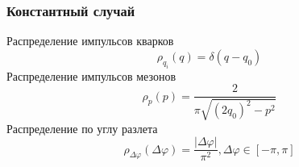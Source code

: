 \documentclass{beamer}
\renewcommand{\l}{\left( }
\renewcommand{\r}{\right) }
\renewcommand{\phi}{\varphi}
\newcommand{\br}[1]{\l {#1} \r}
\newcommand{\abs}[1]{\left| #1 \right|}
\begin{document}
\begin{frame}[fragile]
\frametitle{Константный случай}
\begin{minipage}[h]{0.48\linewidth}
Распределение импульсов кварков
$$\rho_{q_i} \br{q} = \delta \br{q - q_0}$$
$$$$
$$$$
Распределение импульсов мезонов
$$\rho_p \br{p} = \frac{2}{\pi\sqrt{\br{2 q_0}^2 -p^2}}$$
Распределение по углу разлета
$$\rho_{\Delta \phi} \br{\Delta \phi} = \frac{\abs{\Delta \phi}}{\pi^2}, \Delta \phi \in \left[ -\pi, \pi \right]$$
\end{minipage}
\begin{minipage}[h]{0.48\linewidth}
\end{minipage}
\end{frame}
\end{document}
